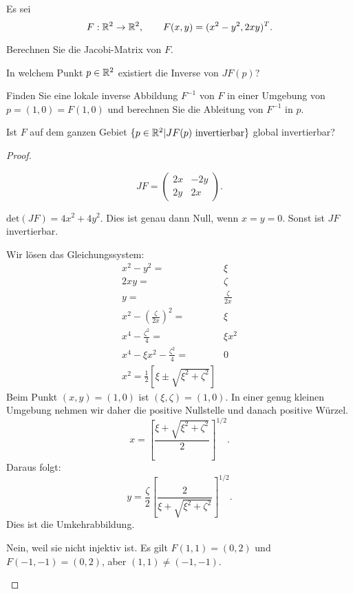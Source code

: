 \begin{Problem}
	Es sei
	\[
		F:\mathbb{R}^2\to \mathbb{R}^2, \qquad F(x,y)=(x^2-y^2,2xy)^T
	.\] 
	\begin{parts}
	\item Berechnen Sie die Jacobi-Matrix von $F$.
	\item In welchem Punkt $p\in \mathbb{R}^2$ existiert die Inverse von $JF(p)$?
	\item Finden Sie eine lokale inverse Abbildung $F^{-1}$ von $F$ in einer Umgebung von $p=(1,0)=F(1,0)$ und berechnen Sie die Ableitung von $F^{-1}$ in $p$.
	\item Ist $F$ auf dem ganzen Gebiet $\{p\in \mathbb{R}^2|JF(p)\text{ invertierbar}\} $ global invertierbar?
	\end{parts}
\end{Problem}
\begin{proof}
	\begin{parts}
	\item
		\[
			JF=\begin{pmatrix} 2x & -2y \\ 2y & 2x \end{pmatrix} 
		.\] 
	\item $\text{det}(JF)=4x^2+4y^2$. Dies ist genau dann Null, wenn $x=y=0$. Sonst ist $JF$ invertierbar.
	\item Wir lösen das Gleichungssystem:
		\begin{align*}
			x^2-y^2=&\xi\\
			2xy=&\zeta\\
			y=&\frac{\zeta}{2x}\\
			x^2-\left( \frac{\zeta}{2x} \right)^2=&\xi\\
			x^4-\frac{\zeta^2}{4}=&\xi x^2\\
			x^4 - \xi x^2-\frac{\zeta^2}{4}=&0\\
			x^2=\frac{1}{2}\left[ \xi\pm \sqrt{\xi^2+\zeta^2}  \right] 
		\end{align*}
		Beim Punkt $(x,y)=(1,0)$ ist $(\xi,\zeta)=(1,0)$. In einer genug kleinen Umgebung nehmen wir daher die positive Nullstelle und danach positive Würzel.
		\[
			x=\left[ \frac{\xi+\sqrt{\xi^2+\zeta^2} }{2} \right]^{1 / 2}
		.\] 
		Daraus folgt:
		\[
			y=\frac{\zeta}{2}\left[ \frac{2}{\xi+\sqrt{\xi^2+\zeta^2} } \right]^{1 / 2}
		.\] 
		Dies ist die Umkehrabbildung.	
	\item Nein, weil sie nicht injektiv ist. Es gilt $F(1,1)=(0,2)$ und $F(-1,-1)=(0,2)$, aber $(1,1)\neq (-1,-1)$.\qedhere 
	\end{parts}
\end{proof}
